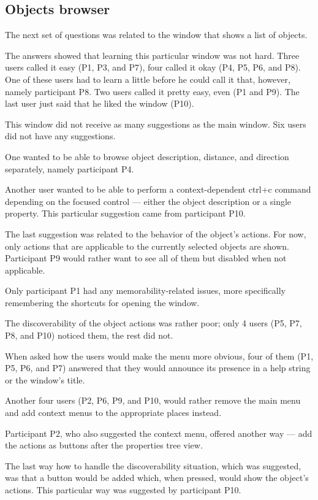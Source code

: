\documentclass[nolof,digital]{fithesis3}
\begin{document}
\subsection{Objects browser}
The next set of questions was related to the window that shows a list of objects.

The answers showed that learning this particular window was not hard. Three users called it easy (P1, P3, and P7), four called it okay (P4, P5, P6, and P8). One of these users had to learn a little before he could call it that, however, namely participant P8. Two users called it pretty easy, even (P1 and P9). The last user just said that he liked the window (P10).

This window did not receive as many suggestions as the main window. Six users did not have any suggestions.

One wanted to be able to browse object description, distance, and direction separately, namely participant P4.

Another user wanted to be able to perform a context-dependent ctrl+c command depending on the focused control --- either the object description or a single property. This particular suggestion came from participant P10.

The last suggestion was related to the behavior of the object's actions. For now, only actions that are applicable to the currently selected objects are shown. Participant P9 would rather want to see all of them but disabled when not applicable.

Only participant P1 had any memorability-related issues, more specifically remembering the shortcuts for opening the window.

The discoverability of the object actions was rather poor; only 4 users (P5, P7, P8, and P10) noticed them, the rest did not.

When asked how the users would make the menu more obvious, four of them (P1, P5, P6, and P7) answered that they would announce its presence in a help string or the window's title.

Another four users (P2, P6, P9, and P10, would rather remove the main menu and add context menus to the appropriate places instead.

Participant P2, who also suggested the context menu, offered another way --- add the actions as buttons after the properties tree view.

The last way how to handle the discoverability situation, which was suggested, was that a button would be added which, when pressed, would show the object's actions. This particular way was suggested by participant P10.
\end{document}
